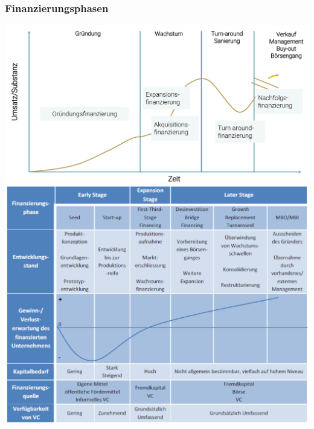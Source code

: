 \subsubsection{Finanzierungsphasen}
\begin{multicols}{2}
	\includegraphics[width=1\linewidth]{images/finanzierungsphasen}
	\includegraphics[width=1\linewidth]{images/finanzierungsphasen_2}
\end{multicols}


